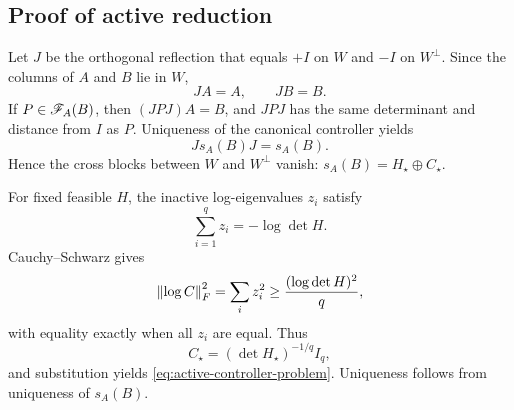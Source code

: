 \subsection{Proof of active reduction}

Let \(J\) be the orthogonal reflection that equals \(+I\) on \(W\) and
\(-I\) on \(W^\perp\).  Since the columns of \(A\) and \(B\) lie in \(W\),
\[
  JA=A,
  \qquad JB=B.
\]
If \(P\in\mathscr F_A(B)\), then \((JPJ)A=B\), and \(JPJ\) has the same
determinant and distance from \(I\) as \(P\).  Uniqueness of the canonical
controller yields
\[
  Js_A(B)J=s_A(B).
\]
Hence the cross blocks between \(W\) and \(W^\perp\) vanish:
\(s_A(B)=H_\star\oplus C_\star\).

For fixed feasible \(H\), the inactive log-eigenvalues \(z_i\) satisfy
\[
  \sum_{i=1}^qz_i=-\log\det H.
\]
Cauchy--Schwarz gives
\[
  \left\lVert \log C\right\rVert_F^2=\sum_i z_i^2
  \ge\frac{(\log\det H)^2}{q},
\]
with equality exactly when all \(z_i\) are equal.  Thus
\[
  C_\star=(\det H_\star)^{-1/q}I_q,
\]
and substitution yields \cref{eq:active-controller-problem}.  Uniqueness
follows from uniqueness of \(s_A(B)\).
